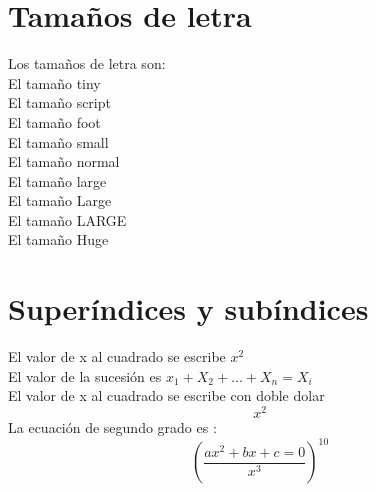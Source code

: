 \documentclass[10pt,a4paper]{report}
\begin{document}
    \section{Tamaños de letra}
     Los tamaños de letra son: \\
     {\tiny El tamaño tiny}\\
     {\scriptsize El tamaño script}\\
     {\footnotesize El tamaño foot}\\
     {\small El tamaño small}\\
     {\normalsize El tamaño normal}\\
     {\large El tamaño large}\\
     {\Large El tamaño Large}\\
     {\LARGE El tamaño LARGE}\\
     {\huge El tamaño Huge}\\
    
    \section{Superíndices y subíndices}
     El valor de x al cuadrado se escribe $ x^2 $ \\
     El valor de la sucesión es $ x_1 + X_2 + ... + X_n = X_i $ \\
     El valor de x al cuadrado se escribe con doble dolar $$ x^2$$
     La ecuación de segundo grado es :
     $$ (\frac{ ax^2 + bx +c = 0} {x^3}) ^{10} $$
\end{document}
